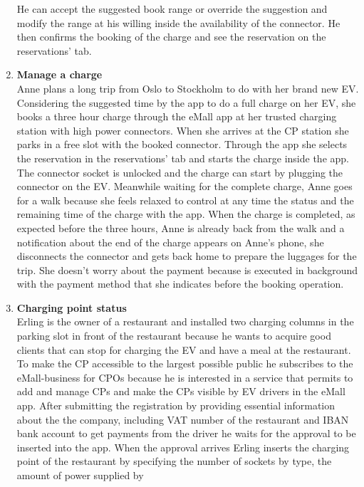\begin{enumerate}[label=\textbf{\Alph*}.]
            He can accept the suggested book range or override the suggestion and modify the range at his willing inside the
            availability of the connector. He then confirms the booking of the charge and see the reservation on the reservations' tab.
      \item \textbf{Manage a charge} \\
            Anne plans a long trip from Oslo to Stockholm to do with her brand new EV.
            Considering the suggested time by the app to do a full charge on her EV, she books a three hour charge through the eMall
            app at her trusted charging station with high power connectors.
            When she arrives at the CP station she parks in a free slot with the booked connector. Through the app she selects
            the reservation in the reservations' tab and starts the charge inside the app. The connector socket is unlocked and
            the charge can start by plugging the connector on the EV. Meanwhile waiting for the complete charge, Anne goes for a walk
            because she feels relaxed to control at any time the status and the remaining time of the charge with the app. When the charge
            is completed, as expected before the three hours, Anne is already back from the walk and a notification about the end of the charge
            appears on Anne's phone, she disconnects the connector and gets back home to prepare the luggages for the trip. She doesn't worry about
            the payment because is executed in background with the payment method that she indicates before the booking operation.
      \item \textbf{Charging point status} \\
            Erling is the owner of a restaurant and installed two charging columns in the parking slot in front of the restaurant because
            he wants to acquire good clients that can stop for charging the EV and have a meal at the restaurant. To make the CP accessible to the largest
            possible public he subscribes to the eMall-business for CPOs because he is interested in a service that permits to add and manage CPs and make
            the CPs visible by EV drivers in the eMall app. After submitting the registration by providing essential information about the the company, including
            VAT number of the restaurant and IBAN bank account to get payments from the driver he waits for the approval to be inserted into the app.
            When the approval arrives Erling inserts the charging point of the restaurant by specifying the number of sockets by type, the amount of power supplied by

\end{enumerate}
